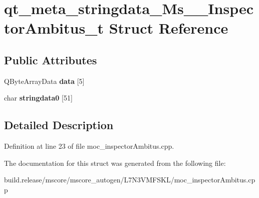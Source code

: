 \hypertarget{structqt__meta__stringdata___ms_____inspector_ambitus__t}{}\section{qt\+\_\+meta\+\_\+stringdata\+\_\+\+Ms\+\_\+\+\_\+\+Inspector\+Ambitus\+\_\+t Struct Reference}
\label{structqt__meta__stringdata___ms_____inspector_ambitus__t}
\subsection*{Public Attributes}
\begin{DoxyCompactItemize}
\item 
\mbox{\label{structqt__meta__stringdata___ms_____inspector_ambitus__t_a3097538dbf552a1dd7f378523bf6b345}} 
Q\+Byte\+Array\+Data {\bfseries data} \mbox{[}5\mbox{]}
\item 
\mbox{\label{structqt__meta__stringdata___ms_____inspector_ambitus__t_ac2d7c32d670901d3f081f2417394bdc6}} 
char {\bfseries stringdata0} \mbox{[}51\mbox{]}
\end{DoxyCompactItemize}


\subsection{Detailed Description}


Definition at line 23 of file moc\+\_\+inspector\+Ambitus.\+cpp.



The documentation for this struct was generated from the following file\+:\begin{DoxyCompactItemize}
\item 
build.\+release/mscore/mscore\+\_\+autogen/\+L7\+N3\+V\+M\+F\+S\+K\+L/moc\+\_\+inspector\+Ambitus.\+cpp\end{DoxyCompactItemize}
